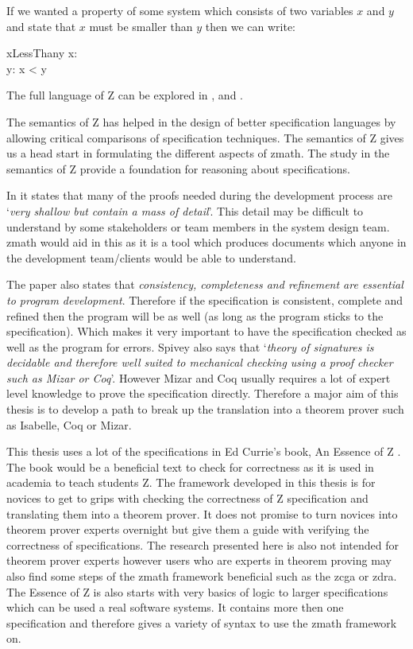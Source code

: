 If we wanted a property of some system which consists of two variables $x$ and $y$ and state that $x$ must be smaller than $y$ then we can write:

\begin{schema}{xLessThany}
x: \nat \\
y: \nat
\where
x < y
\end{schema}

The full language of Z can be explored in \cite{spiveyreferencemanual}, \cite{essenceofz} and \cite{Woodcock:1996:UZS:235337}.

The semantics of Z has helped in the design of better specification languages by allowing critical comparisons of specification techniques. The semantics of Z \cite{formsem} gives us a head start in formulating the different aspects of \gls{zmath}. The study in the semantics of Z provide a foundation for reasoning about specifications.

In \cite{formsem} it states that many of the proofs needed during the development process are `\textit{very shallow but contain a mass of detail}'. This detail may be difficult to understand by some stakeholders or team members in the system design team. \Gls{zmath} would aid in this as it is a tool which produces documents which anyone in the development team/clients would be able to understand.

The paper also states that \textit{consistency, completeness and refinement are essential to program development}. Therefore if the specification is consistent, complete and refined then the program will be as well (as long as the program sticks to the specification). Which makes it very important to have the specification checked as well as the program for errors. Spivey also says that `\textit{theory  of signatures is decidable and therefore well suited to mechanical checking using a proof checker such as Mizar or Coq}'. However Mizar and Coq usually requires a lot of expert level knowledge to prove the specification directly. Therefore a major aim of this thesis is to develop a path to break up the translation into a theorem prover such as Isabelle, Coq or Mizar.

This thesis uses a lot of the specifications in Ed Currie's book, An Essence of Z \cite{essenceofz}. The book would be a beneficial text to check for correctness as it is used in academia to teach students Z. The framework developed in this thesis is for novices to get to grips with checking the correctness of Z specification and translating them into a theorem prover. It does not promise to turn novices into theorem prover experts overnight but give them a guide with verifying the correctness of specifications. The research presented here is also not intended for theorem prover experts however users who are experts in theorem proving may also find some steps of the \gls{zmath} framework beneficial such as the \gls{zcga} or \gls{zdra}. The Essence of Z is also starts with very basics of logic to larger specifications which can be used a real software systems. It contains more then one specification and therefore gives a variety of syntax to use the \gls{zmath} framework on.

